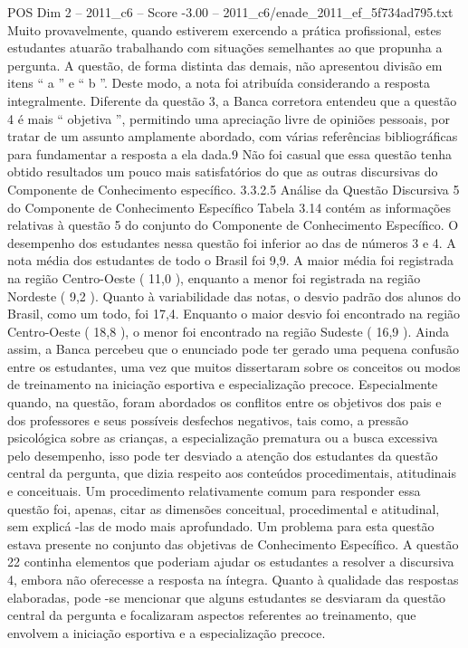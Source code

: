\begin{textsample}{POS Dim 2 – 2011\_c6 – Score -3.00 – 2011\_c6/enade\_2011\_ef\_5f734ad795.txt}
Muito provavelmente, quando estiverem exercendo a prática profissional, estes estudantes atuarão trabalhando com situações semelhantes ao que propunha a pergunta.
A questão, de forma distinta das demais, não apresentou divisão em itens “ a ” e “ b ”.
Deste modo, a nota foi atribuída considerando a resposta integralmente.
Diferente da questão 3, a Banca corretora entendeu que a questão 4 é mais “ objetiva ”, permitindo uma apreciação livre de opiniões pessoais, por tratar de um assunto amplamente abordado, com várias referências bibliográficas para fundamentar a resposta a ela dada.9 Não foi casual que essa questão tenha obtido resultados um pouco mais satisfatórios do que as outras discursivas do Componente de Conhecimento específico. 3.3.2.5 Análise da Questão Discursiva 5 do Componente de Conhecimento Específico Tabela 3.14 contém as informações relativas à questão 5 do conjunto do Componente de Conhecimento Específico.
O desempenho dos estudantes nessa questão foi inferior ao das de números 3 e 4.
A nota média dos estudantes de todo o Brasil foi 9,9.
A maior média foi registrada na região Centro-Oeste ( 11,0 ), enquanto a menor foi registrada na região Nordeste ( 9,2 ).
Quanto à variabilidade das notas, o desvio padrão dos alunos do Brasil, como um todo, foi 17,4.
Enquanto o maior desvio foi encontrado na região Centro-Oeste ( 18,8 ), o menor foi encontrado na região Sudeste ( 16,9 ).
Ainda assim, a Banca percebeu que o enunciado pode ter gerado uma pequena confusão entre os estudantes, uma vez que muitos dissertaram sobre os conceitos ou modos de treinamento na iniciação esportiva e especialização precoce.
Especialmente quando, na questão, foram abordados os conflitos entre os objetivos dos pais e dos professores e seus possíveis desfechos negativos, tais como, a pressão psicológica sobre as crianças, a especialização prematura ou a busca excessiva pelo desempenho, isso pode ter desviado a atenção dos estudantes da questão central da pergunta, que dizia respeito aos conteúdos procedimentais, atitudinais e conceituais.
Um procedimento relativamente comum para responder essa questão foi, apenas, citar as dimensões conceitual, procedimental e atitudinal, sem explicá -las de modo mais aprofundado.
Um problema para esta questão estava presente no conjunto das objetivas de Conhecimento Específico.
A questão 22 continha elementos que poderiam ajudar os estudantes a resolver a discursiva 4, embora não oferecesse a resposta na íntegra.
Quanto à qualidade das respostas elaboradas, pode -se mencionar que alguns estudantes se desviaram da questão central da pergunta e focalizaram aspectos referentes ao treinamento, que envolvem a iniciação esportiva e a especialização precoce.

\end{textsample}
